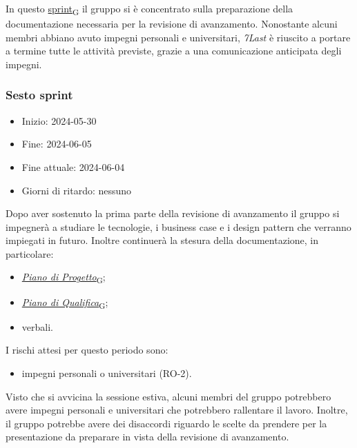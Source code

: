 In questo \href{https://7last.github.io/docs/rtb/documentazione-interna/glossario\#sprint}{sprint\textsubscript{G}} il gruppo si è concentrato sulla preparazione della documentazione necessaria per la revisione
di avanzamento.
Nonostante alcuni membri abbiano avuto impegni personali e universitari, \textit{7Last} è riuscito a portare a termine
tutte le attività previste, grazie a una comunicazione anticipata degli impegni.\\



\newpage
\subsubsection{Sesto sprint}
\begin{itemize}
	\item Inizio: 2024-05-30
	\item Fine: 2024-06-05
	\item Fine attuale: 2024-06-04
	\item Giorni di ritardo: nessuno
\end{itemize}

Dopo aver sostenuto la prima parte della revisione di avanzamento il gruppo si impegnerà a studiare le tecnologie, i business case e i design pattern che verranno impiegati in futuro.
Inoltre continuerà la stesura della documentazione, in particolare:
\begin{itemize}
	\item \href{https://7last.github.io/docs/rtb/documentazione-interna/glossario\#piano-di-progetto}{\textit{Piano di Progetto}\textsubscript{G}};
	\item \href{https://7last.github.io/docs/rtb/documentazione-interna/glossario\#piano-di-qualifica}{\textit{Piano di Qualifica}\textsubscript{G}};
	\item verbali.
\end{itemize}

I rischi attesi per questo periodo sono:
\begin{itemize}
	\item impegni personali o universitari (RO-2).
\end{itemize}
Visto che si avvicina la sessione estiva, alcuni membri del gruppo potrebbero avere impegni personali e universitari che
potrebbero rallentare il lavoro.
Inoltre, il gruppo potrebbe avere dei disaccordi riguardo le scelte da prendere per la  presentazione da preparare in
vista della revisione di avanzamento.

